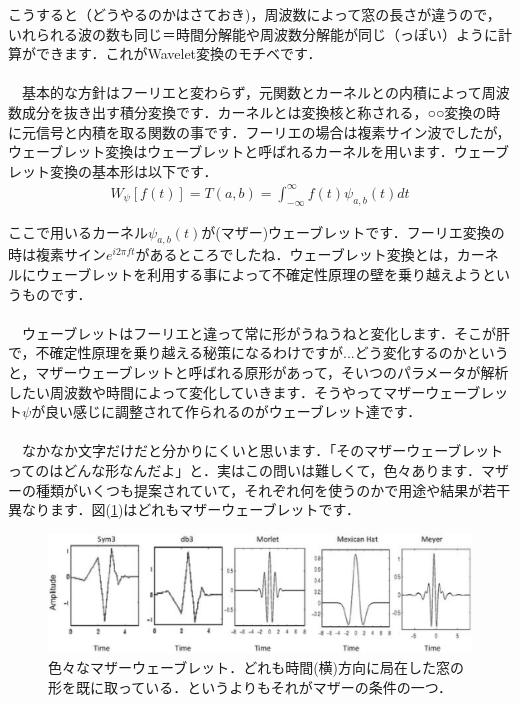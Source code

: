 \documentclass[11pt,a4paper]{ujreport} 	%
\begin{document}
こうすると（どうやるのかはさておき)，周波数によって窓の長さが違うので，いれられる波の数も同じ＝時間分解能や周波数分解能が同じ（っぽい）ように計算ができます．これがWavelet変換のモチベです．\\
\\
　基本的な方針はフーリエと変わらず，元関数とカーネルとの内積によって周波数成分を抜き出す積分変換です．カーネルとは変換核と称される，○○変換の時に元信号と内積を取る関数の事です．フーリエの場合は複素サイン波でしたが，ウェーブレット変換はウェーブレットと呼ばれるカーネルを用います．ウェーブレット変換の基本形は以下です．\\

\begin{eqnarray}
W_\psi[f(t)]  = T(a,b) = \int_{-\infty}^{\infty} f(t)\psi_{a,b}(t) dt
\label{eq:wavelet_transform}
\end{eqnarray}

ここで用いるカーネル$\psi_{a,b}(t)$が(マザー)ウェーブレットです．フーリエ変換の時は複素サイン$e^{i2\pi ft}$があるところでしたね．ウェーブレット変換とは，カーネルにウェーブレットを利用する事によって不確定性原理の壁を乗り越えようというものです．\\
\\
　ウェーブレットはフーリエと違って常に形がうねうねと変化します．そこが肝で，不確定性原理を乗り越える秘策になるわけですが...どう変化するのかというと，マザーウェーブレットと呼ばれる原形があって，そいつのパラメータが解析したい周波数や時間によって変化していきます．そうやってマザーウェーブレット$\psi$が良い感じに調整されて作られるのがウェーブレット達です．\\
\\
　なかなか文字だけだと分かりにくいと思います．「そのマザーウェーブレットってのはどんな形なんだよ」と．実はこの問いは難しくて，色々あります．マザーの種類がいくつも提案されていて，それぞれ何を使うのかで用途や結果が若干異なります．図(\ref{im:wavelets})はどれもマザーウェーブレットです．

\begin{figure}[H]
  \label{im:wavelets}
  \centering
  \includegraphics[width=12cm]{../figures/wavelets.eps}
  \caption{色々なマザーウェーブレット．どれも時間(横)方向に局在した窓の形を既に取っている．というよりもそれがマザーの条件の一つ．}
\end{figure}
\end{document}
